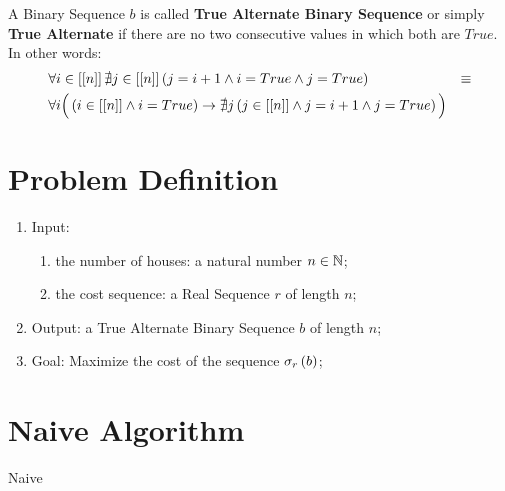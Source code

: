 \begin{defn}
    A Binary Sequence $b$ is called \textbf{True Alternate Binary Sequence} or simply \textbf{True Alternate} if there are no two consecutive values in which both are $True$. In other words:
    \begin{align}
        & \forall i \in \range{n} \nexists j \in \range{n} \left(
            j = i + 1
            \land
            i = True
            \land
            j = True
        \right)
        & \equiv \\\nonumber
        &
        \forall i \Big(
            \left(i \in \range{n} \land i = True\right)
            \rightarrow
            \nexists j \left(
                j \in \range{n}
                \land
                j = i + 1
                \land
                j = True
            \right)
        \Big) &
    \end{align}
\end{defn}

\section{Problem Definition}

\begin{enumerate}
    \item Input:
    \begin{enumerate}
        \item the number of houses: a natural number $n \in \N$;
        \item the cost sequence: a Real Sequence $r$ of length $n$;
    \end{enumerate}
    \item Output: a True Alternate Binary Sequence $b$ of length $n$;
    \item Goal: Maximize the cost of the sequence $\cost{b}{r}$;
\end{enumerate}

\section{Naive Algorithm}

\begin{algorithm}[H]
    \caption{Naive}
    \label{burglar's-night-out:algorithm:naive}
    \begin{algorithmic}[1]
    \end{algorithmic}
\end{algorithm}

